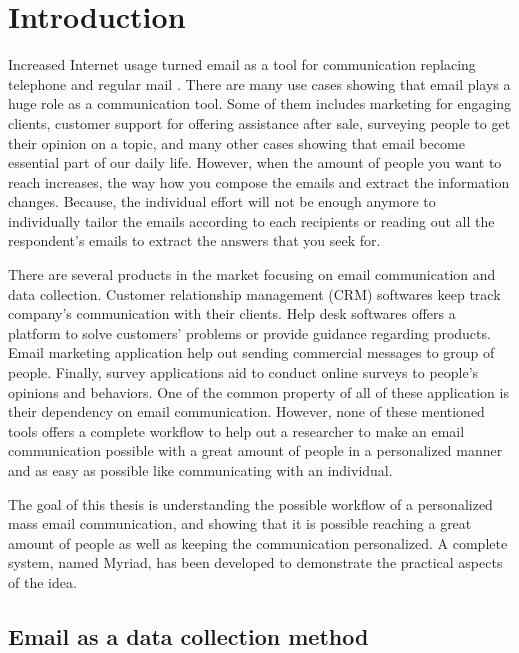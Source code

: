 \chapter{Introduction}
\label{chp:Intro}
Increased Internet usage turned email as a tool for communication replacing telephone and regular mail \citep{Norman2000,Madden2003}. There are many use cases showing that email plays a huge role as a communication tool. Some of them includes marketing for engaging clients, customer support for offering assistance after sale, surveying people to get their opinion on a topic, and many other cases showing that email become essential part of our daily life.
However, when the amount of people you want to reach increases, the way how you compose the emails and extract the information changes. Because, the individual effort will not be enough anymore to individually tailor the emails according to each recipients or reading out all the respondent's emails to extract the answers that you seek for.
\vspace{1cm}

There are several products in the market focusing on email communication and data collection. Customer relationship management (CRM) softwares keep track company's communication with their clients. Help desk softwares offers a platform to solve customers' problems or provide guidance regarding products. Email marketing application help out sending commercial messages to group of people. Finally, survey applications aid to conduct online surveys to people's opinions and behaviors. One of the common property of all of these application is their dependency on email communication. However, none of these mentioned tools offers a complete workflow to help out a researcher to make an email communication possible with a great amount of people in a personalized manner and as easy as possible like communicating with an individual.
\vspace{1cm}

The goal of this thesis is understanding the possible workflow of a personalized mass email communication, and showing that it is possible reaching a great amount of people as well as keeping the communication personalized. A complete system, named Myriad, has been developed to demonstrate the practical aspects of the idea.

\section{Email as a data collection method}
\label{sec:1:EmailDataCol}

